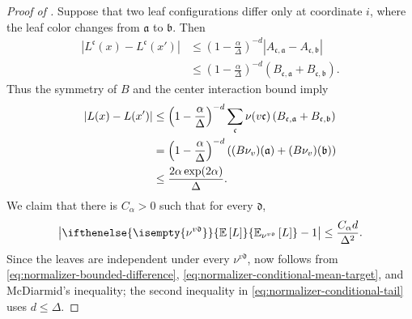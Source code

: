 \documentclass[a4paper,12pt]{article}
\theoremstyle{plain}
\theoremstyle{definition}
\def\!#1{\mathfrak{#1}} %
\def\!#1{\mathfrak{#1}} %
\def\oE{\mathbb{E}}
\newcommand{\E}[2][]{ \ifthenelse{\isempty{#1}}
  {\oE\left[#2\right]}
  {\oE_{#1}\left[#2\right]} }
\newcommand{\tuple}[1]{\left(#1\right)}
\newcommand{\tp}{\tuple}
\newcommand{\abs}[1]{\left\vert#1\right\vert}
\begin{document}
\begin{proof}[Proof of ]
Suppose that two leaf configurations differ only at coordinate $i$,
where the leaf color changes from $\!a$ to $\!b$.  Then
\begin{align*}
  \abs{L^{\!c}(x)-L^{\!c}(x')}
  &\leq
  \tp{1-\frac{\alpha}{\Delta}}^{-d}
  \abs{A_{\!c,\!a}-A_{\!c,\!b}}
  \\
  &\leq
  \tp{1-\frac{\alpha}{\Delta}}^{-d}
  \tp{B_{\!c,\!a}+B_{\!c,\!b}}.
\end{align*}
Thus the symmetry of $B$ and the center interaction bound imply
\begin{align}
  \abs{L(x)-L(x')}
  &\leq
  \tp{1-\frac{\alpha}{\Delta}}^{-d}
  \sum_{\!c}\nu(v\!c)
  \tp{B_{\!c,\!a}+B_{\!c,\!b}}
  \notag\\
  \notag
  &= \tp{1-\frac{\alpha}{\Delta}}^{-d}\tp{(B\nu_v)(\!a) + (B\nu_v)(\!b)}\\
  &\leq
  \frac{2\alpha\exp(2\alpha)}{\Delta}.
  \label{eq:normalizer-bounded-difference}
\end{align}
We claim that there is $C_\alpha > 0$ such that for every $\!d$,
\begin{align}
  \abs{\E[\nu^{v\!d}]{L}-1}
  \leq
  \frac{C_{\alpha}d}{\Delta^2}.
  \label{eq:normalizer-conditional-mean-target}
\end{align}
Since the leaves are independent under every $\nu^{v\!d}$,  now follows from \eqref{eq:normalizer-bounded-difference},
\eqref{eq:normalizer-conditional-mean-target}, and McDiarmid's inequality;
the second inequality in \eqref{eq:normalizer-conditional-tail} uses
$d\leq\Delta$.


\end{proof}
\end{document}
